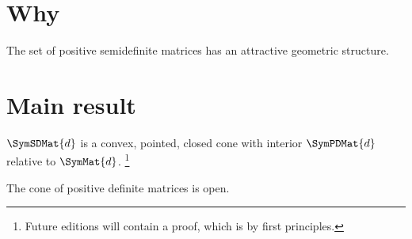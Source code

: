 
\section*{Why}

The set of positive semidefinite matrices has an attractive geometric structure.

\section*{Main result}

\begin{proposition}
$\SymSDMat{d}$ is a convex, pointed, closed cone with interior $\SymPDMat{d}$ relative to $\SymMat{d}$.
  \ifhmode\unskip\fi\footnote{
Future editions will contain a proof, which is by first principles.
  }
\end{proposition}

The cone of positive definite matrices is open.

\blankpage